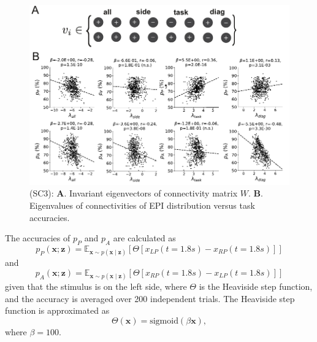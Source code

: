 \documentclass[11pt]{article}
\begin{document}
\begin{figure}
\begin{center}
\includegraphics[scale=0.9]{figures/figSC3/figSC3.pdf}
\end{center}
\caption{\small (SC3):  
\textbf{A}. Invariant eigenvectors of connectivity matrix $W$.
\textbf{B}. Eigenvalues of connectivities of EPI distribution versus task accuracies.
}
\label{fig:SC3}
\end{figure}

The accuracies of $p_P$ and $p_A$ are calculated as
\begin{equation}
p_P(\mathbf{x}; \mathbf{z}) = \mathbb{E}_{\mathbf{x} \sim p(\mathbf{x} \mid \mathbf{z})}\left[\Theta[x_{LP}(t=1.8s) - x_{RP}(t=1.8s)]\right]
\end{equation}
and 
\begin{equation}
p_A(\mathbf{x}; \mathbf{z}) = \mathbb{E}_{\mathbf{x} \sim p(\mathbf{x} \mid \mathbf{z})}\left[\Theta[x_{RP}(t=1.8s) - x_{LP}(t=1.8s)]\right]
\end{equation}
given that the stimulus is on the left side, where $\Theta$ is the Heaviside step function, and the accuracy is averaged over 200 independent trials.  The Heaviside step function is approximated as
\begin{equation}
\Theta(\mathbf{x}) = \text{sigmoid}(\beta \mathbf{x}),
\end{equation}
where $\beta = 100$.
\end{document}
